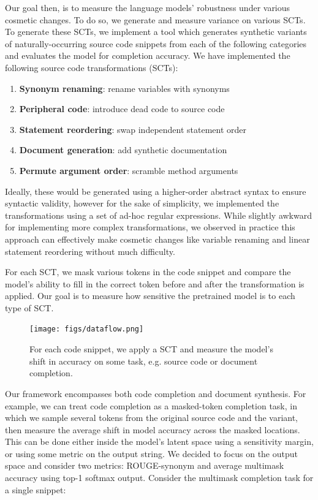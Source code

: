 \documentclass[sigconf,review,anonymous]{acmart}
\begin{document}
  Our goal then, is to measure the language models' robustness under various cosmetic changes. To do so, we generate and measure variance on various SCTs. To generate these SCTs, we implement a tool which generates synthetic variants of naturally-occurring source code snippets from each of the following categories and evaluates the model for completion accuracy. We have implemented the following source code transformations (SCTs):

  \begin{enumerate}
    \item \textbf{Synonym renaming}: rename variables with synonyms
    \item \textbf{Peripheral code}: introduce dead code to source code
    \item \textbf{Statement reordering}: swap independent statement order
    \item \textbf{Document generation}: add synthetic documentation
    \item \textbf{Permute argument order}: scramble method arguments
  \end{enumerate}

  Ideally, these would be generated using a higher-order abstract syntax to ensure syntactic validity, however for the sake of simplicity, we implemented the transformations using a set of ad-hoc regular expressions. While slightly awkward for implementing more complex transformations, we observed in practice this approach can effectively make cosmetic changes like variable renaming and linear statement reordering without much difficulty.

  For each SCT, we mask various tokens in the code snippet and compare the model's ability to fill in the correct token before and after the transformation is applied. Our goal is to measure how sensitive the pretrained model is to each type of SCT.

  \begin{figure}[H]
    \centering
    \texttt{[image: figs/dataflow.png]}
    \caption{For each code snippet, we apply a SCT and measure the model's shift in accuracy on some task, e.g. source code or document completion.}
    \label{fig:dataflow}
  \end{figure}

  Our framework encompasses both code completion and document synthesis. For example, we can treat code completion as a masked-token completion task, in which we sample several tokens from the original source code and the variant, then measure the average shift in model accuracy across the masked locations. This can be done either inside the model's latent space using a sensitivity margin, or using some metric on the output string. We decided to focus on the output space and consider two metrics: ROUGE-synonym and average multimask accuracy using top-1 softmax output. Consider the multimask completion task for a single snippet:
\end{document}
